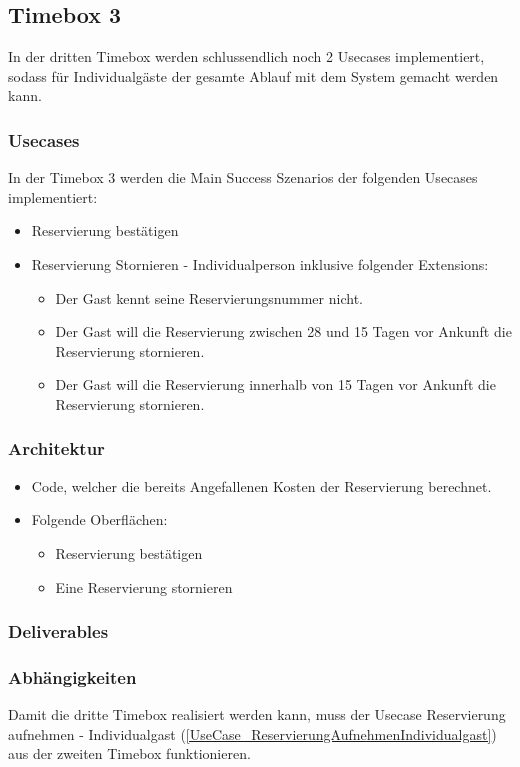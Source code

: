\subsection{Timebox 3}
In der dritten Timebox werden schlussendlich noch 2 Usecases implementiert, sodass für Individualgäste der gesamte Ablauf mit dem System gemacht werden kann.

\subsubsection{Usecases}
In der Timebox 3 werden die Main Success Szenarios der folgenden Usecases implementiert:

\begin{itemize}
	\item \Gls{Reservierung} bestätigen
	\item \Gls{Reservierung} Stornieren - Individualperson inklusive folgender Extensions:
	\begin{itemize}
		\item Der \Gls{Gast} kennt seine \Gls{Reservierungsnummer} nicht.
		\item Der \Gls{Gast} will die Reservierung zwischen 28 und 15 Tagen vor Ankunft die Reservierung stornieren.
		\item Der \Gls{Gast} will die Reservierung innerhalb von 15 Tagen vor Ankunft die Reservierung stornieren.
	\end{itemize}
\end{itemize}
\subsubsection{Architektur}
\begin{itemize}
	\item Code, welcher die bereits Angefallenen Kosten der Reservierung berechnet.
	\item Folgende Oberflächen:
	\begin{itemize}
		\item Reservierung bestätigen
		\item Eine Reservierung stornieren
	\end{itemize}
\end{itemize}
\subsubsection{Deliverables}
\subsubsection{Abhängigkeiten}
Damit die dritte Timebox realisiert werden kann, muss der Usecase Reservierung aufnehmen - Individualgast (\ref{UseCase_ReservierungAufnehmenIndividualgast}) aus der zweiten Timebox funktionieren.
